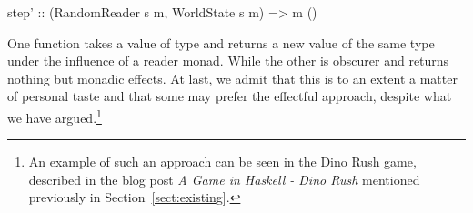 \documentclass[
  digital, %
  color,   %
  table,   %
  oneside, %
  lof,     %
  lot,     %
]{fithesis3}
\newcommand{\cpp}{C\nolinebreak\texttt{+}\nolinebreak\texttt{+}}
\begin{document}
{\begin{haskell}
step' :: (RandomReader s m, WorldState s m) => m ()
\end{haskell}
One function takes a value of type  and returns
a new value of the same type under the influence of a reader monad.
While the other is obscurer and returns nothing but monadic effects.
At last, we admit that this is to an extent a matter of personal taste
and that some may prefer the effectful approach, despite what we have argued.\footnote{
An example of such an approach can be seen in the Dino Rush game,
described in the blog post \emph{A Game in Haskell - Dino Rush} \cite{dinorush} mentioned
previously in Section~\ref{sect:existing}.
}










}
\end{document}
